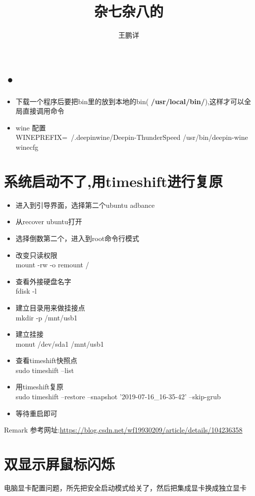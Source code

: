 \documentclass[12pt,a4paper]{article}
\title{杂七杂八的}
\author{王鹏详}
\date{\chntoday}
\begin{document}
	\maketitle
	\newpage

\section{•}
\begin{itemize}
\item 下载一个程序后要把bin里的放到本地的bin( \textbf{/usr/local/bin/}),这样才可以全局直接调用命令
\item wine 配置 \\
WINEPREFIX=~/.deepinwine/Deepin-ThunderSpeed  /usr/bin/deepin-wine  winecfg
\end{itemize}
	
\section{系统启动不了,用timeshift进行复原}
\begin{itemize}
\item 进入到引导界面，选择第二个ubuntu adbance
\item 从recover ubuntu打开
\item 选择倒数第二个，进入到root命令行模式
\item 改变只读权限 \\mount -rw -o remount /
\item 查看外接硬盘名字 \\ fdisk -l
\item 建立目录用来做挂接点 \\ mkdir -p /mnt/usb1
\item 建立挂接 \\ monut /dev/sda1 /mnt/usb1
\item 查看timeshift快照点 \\ sudo timeshift --list
\item 用timeshift复原 \\ sudo timeshift --restore --snapshot '2019-07-16\_16-35-42' --skip-grub
\item 等待重启即可
\end{itemize}
\begin{block}{Remark}
    参考网址:\url{https://blog.csdn.net/wf19930209/article/details/104236358}
\end{block}

\section{双显示屛鼠标闪烁}
电脑显卡配置问题，所先把安全启动模式给关了，然后把集成显卡换成独立显卡
\end{document}
